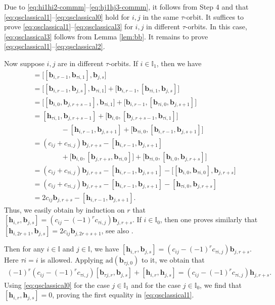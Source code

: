 \documentclass[11pt,reqno]{amsart}
\numberwithin{equation}{section}
\theoremstyle{definition}
\theoremstyle{remark}
\newcommand{\bb}{\mathbf{b}}
\newcommand{\bh}{\mathbf{h}}
\newcommand{\I}{{\mathbb I}}
\begin{document}
Due to \eqref{eq:hi1hi2-commm}--\eqref{eq:hj1hj3-commm}, it follows from Step 4 and \cite[\S3.3]{Lu26min} that \eqref{eq:qsclassical1}--\eqref{eq:qsclassical0} hold for $i,j$ in the same $\tau$-orbit. It suffices to prove \eqref{eq:qsclassical1}--\eqref{eq:qsclassical3} for $i,j$ in different $\tau$-orbits. In this case, \eqref{eq:qsclassical3} follows from Lemma \ref{lem:bb}. It remains to prove \eqref{eq:qsclassical1}--\eqref{eq:qsclassical2}. 

Now suppose $i,j$ are in different $\tau$-orbits. 
If $i\in \I_1$, then we have
\begin{align*}
 [\bh_{i,r},\bb_{j,s}]
 &=
 \bigl[[\bb_{i,r-1},\bb_{\tau i,1}],\bb_{j,s}\bigr]
 \\
 &=
 \bigl[[\bb_{i,r-1},\bb_{j,s}],\bb_{\tau i,1}\bigr]
 +
 \bigl[\bb_{i,r-1},[\bb_{\tau i,1},\bb_{j,s}]\bigr]
 \\
 &=
 \bigl[[\bb_{i,0},\bb_{j,r+s-1}],\bb_{\tau i,1}\bigr]
 +
 \bigl[\bb_{i,r-1},[\bb_{\tau i,0},\bb_{j,s+1}]\bigr]
 \\
 &=
 [\bh_{\tau i,1},\bb_{j,r+s-1}]
 +
 \bigl[\bb_{i,0},[\bb_{j,r+s-1},\bb_{\tau i,1}]\bigr]\\
 &\qquad\qquad-
 [\bh_{i,r-1},\bb_{j,s+1}]
 +
 \bigl[\bb_{\tau i,0},[\bb_{i,r-1},\bb_{j,s+1}]\bigr]
 \\
 &=(c_{ij}+c_{\tau i,j})\bb_{j,r+s}-[\bh_{i,r-1},\bb_{j,s+1}]\\
 &\qquad\qquad
 +
 \bigl[\bb_{i,0},[\bb_{j,r+s},\bb_{\tau i,0}]\bigr]
 +
 \bigl[\bb_{\tau i,0},[\bb_{i,0},\bb_{j,r+s}]\bigr]
 \\
 &=
 (c_{ij}+c_{\tau i,j})\bb_{j,r+s}-[\bh_{i,r-1},\bb_{j,s+1}]-\bigl[[\bb_{i,0},\bb_{\tau i,0}],\bb_{j,r+s}\bigr]
 \\
  &=
 (c_{ij}+c_{\tau i,j})\bb_{j,r+s}-[\bh_{i,r-1},\bb_{j,s+1}]-[\bh_{\tau i,0},\bb_{j,r+s}]
 \\
 &=2c_{ij}\bb_{j,r+s}-[\bh_{i,r-1},\bb_{j,s+1}].
\end{align*}
Thus, we easily obtain by induction on $r$ that $[\bh_{i,r},\bb_{j,s}]=(c_{ij}-(-1)^rc_{\tau i,j})\bb_{j,r+s}$. If $i\in \I_0$, then one proves similarly that $[\bh_{i,2r+1},\bb_{j,s}]=2c_{ij}\bb_{j,2r+s+1}$, see also \cite[Step 3 of \S3.3]{Lu26min}.

Then for any $i\in \I$ and $j\in \I$, we have $[\bh_{i,r},\bb_{j,s}]=(c_{ij}-(-1)^rc_{\tau i,j})\bb_{j,r+s}$. Here $\tau i=i$ is allowed. Applying $\mathrm{ad}(\bb_{\tau j,0})$ to it, we obtain that
\begin{align*}
(-1)^r(c_{ij}-(-1)^rc_{\tau i,j})[\bb_{\tau j,r},\bb_{j,s}]+[\bh_{i,r},\bh_{j,s}]=(c_{ij}-(-1)^rc_{\tau i,j})\bh_{j,r+s}.
\end{align*}
Using \eqref{eq:qsclassical0} for the case $j\in \I_1$ and \cite[(3.42)]{Lu26min} for the case $j\in \I_0$, we find that $[\bh_{i,r},\bh_{j,s}]=0$, proving the first equality in \eqref{eq:qsclassical1}. 
\end{document}
